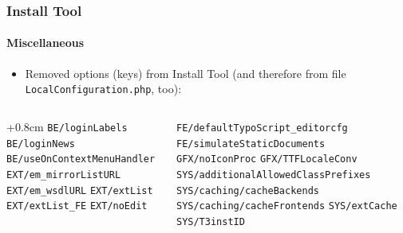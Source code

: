 
\begin{frame}[fragile]
	\frametitle{Install Tool}
	\framesubtitle{Miscellaneous}

	\begin{itemize}
		\item Removed options (keys) from Install Tool\newline
			\small(and therefore from file \texttt{LocalConfiguration.php}, too):\normalsize
	\end{itemize}

	\begin{columns}[T]
		\begin{column}{.5\textwidth}
			\advance\leftskip+0.8cm
			\smaller
				\texttt{BE/loginLabels}\newline
				\texttt{BE/loginNews}\newline
				\texttt{BE/useOnContextMenuHandler}\newline
				\texttt{EXT/em\_mirrorListURL}\newline
				\texttt{EXT/em\_wsdlURL}\newline
				\texttt{EXT/extList}\newline
				\texttt{EXT/extList\_FE}\newline
				\texttt{EXT/noEdit}\newline
			\normalsize
		\end{column}
		\begin{column}{.5\textwidth}
			\smaller
				\texttt{FE/defaultTypoScript\_editorcfg}\newline
				\texttt{FE/simulateStaticDocuments}\newline
				\texttt{GFX/noIconProc}\newline
				\texttt{GFX/TTFLocaleConv}\newline
				\texttt{SYS/additionalAllowedClassPrefixes}\newline
				\texttt{SYS/caching/cacheBackends}\newline
				\texttt{SYS/caching/cacheFrontends}\newline
				\texttt{SYS/extCache}\newline
				\texttt{SYS/T3instID}\newline
			\normalsize
		\end{column}

	\end{columns}

\end{frame}


